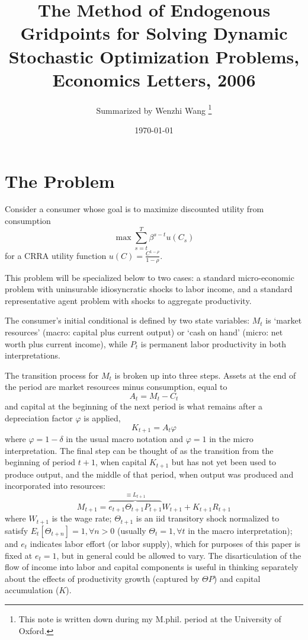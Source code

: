 \documentclass[12pt]{article}
\theoremstyle{definition}
\begin{document}
\title{\bf {The Method of Endogenous Gridpoints for Solving Dynamic Stochastic Optimization Problems, Economics Letters, 2006}}
\author{Summarized by Wenzhi Wang \thanks{This note is written down during my M.phil. period at the University of Oxford. } }
\date{\today}

\maketitle

\section{The Problem}
Consider a consumer whose goal is to maximize discounted utility from consumption
\begin{equation}
	\label{1}
	\max \sum_{s=t}^T \beta^{s-t}u(C_s)
\end{equation}
for a CRRA utility function $u(C) = \frac{C^{1-\rho}}{1-\rho}$.

This problem will be specialized below to two cases: a standard micro-economic problem with uninsurable idiosyncratic shocks to labor income, and a standard representative agent problem with shocks to aggregate productivity.

The consumer's initial conditional is defined by two state variables: $M_t$ is `market resources' (macro: capital plus current output) or `cash on hand' (micro: net worth plus current income), while $P_t$ is permanent labor productivity in both interpretations.

The transition process for $M_t$ is broken up into three steps. Assets at the end of the period are market resources minus consumption, equal to 
\begin{equation}
	\label{2}
	A_t = M_t - C_t
\end{equation}
and capital at the beginning of the next period is what remains after a depreciation factor $\varphi$ is applied,
\begin{equation}
	\label{3}
	K_{t+1} = A_t \varphi
\end{equation}
where $\varphi = 1 - \delta$ in the usual macro notation and $\varphi = 1$ in the micro interpretation. The final step can be thought of as the transition from the beginning of period $t+1$, when capital $K_{t+1}$ but has not yet been used to produce output, and the middle of that period, when output was produced and incorporated into resources:
\begin{equation}
	\label{4}
	M_{t+1}=\overbrace{e_{t+1} \Theta_{t+1} P_{t+1}}^{\equiv L_{t+1}} W_{t+1}+K_{t+1} R_{t+1}
\end{equation}
where $W_{t+1}$ is the wage rate; $\Theta_{t+1}$ is an iid transitory shock normalized to satisfy $E_t \left[\Theta_{t+n}\right] = 1, \forall n > 0$ (usually $\Theta_t = 1, \forall t$ in the macro interpretation); and $e_t$ indicates labor effort (or labor supply), which for purposes of this paper is fixed at $e_t=1$, but in general could be allowed to vary. The disarticulation of the flow of income into labor and capital components is useful in thinking separately about the effects of productivity growth (captured by $\Theta P$) and capital accumulation ($K$).
\end{document}
